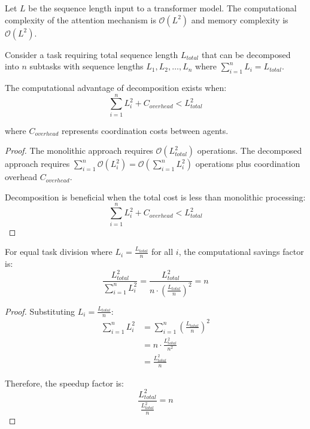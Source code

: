 
\begin{definition}
Let $L$ be the sequence length input to a transformer model. The computational complexity of the attention mechanism is $\mathcal{O}(L^2)$ and memory complexity is $\mathcal{O}(L^2)$.
\end{definition}

\begin{theorem}
Consider a task requiring total sequence length $L_{total}$ that can be decomposed into $n$ subtasks with sequence lengths $L_1, L_2, \ldots, L_n$ where $\sum_{i=1}^{n} L_i = L_{total}$.

The computational advantage of decomposition exists when:
\begin{equation}
\sum_{i=1}^{n} L_i^2 + C_{overhead} < L_{total}^2
\end{equation}

where $C_{overhead}$ represents coordination costs between agents.
\end{theorem}

\begin{proof}
The monolithic approach requires $\mathcal{O}(L_{total}^2)$ operations. The decomposed approach requires $\sum_{i=1}^{n} \mathcal{O}(L_i^2) = \mathcal{O}(\sum_{i=1}^{n} L_i^2)$ operations plus coordination overhead $C_{overhead}$.

Decomposition is beneficial when the total cost is less than monolithic processing:
$$\sum_{i=1}^{n} L_i^2 + C_{overhead} < L_{total}^2$$
\end{proof}

\begin{lemma}
For equal task division where $L_i = \frac{L_{total}}{n}$ for all $i$, the computational savings factor is:
\begin{equation}
\frac{L_{total}^2}{\sum_{i=1}^{n} L_i^2} = \frac{L_{total}^2}{n \cdot \left(\frac{L_{total}}{n}\right)^2} = n
\end{equation}
\end{lemma}

\begin{proof}
Substituting $L_i = \frac{L_{total}}{n}$:
\begin{align}
\sum_{i=1}^{n} L_i^2 &= \sum_{i=1}^{n} \left(\frac{L_{total}}{n}\right)^2\\
&= n \cdot \frac{L_{total}^2}{n^2}\\
&= \frac{L_{total}^2}{n}
\end{align}

Therefore, the speedup factor is:
$$\frac{L_{total}^2}{\frac{L_{total}^2}{n}} = n$$
\end{proof}

